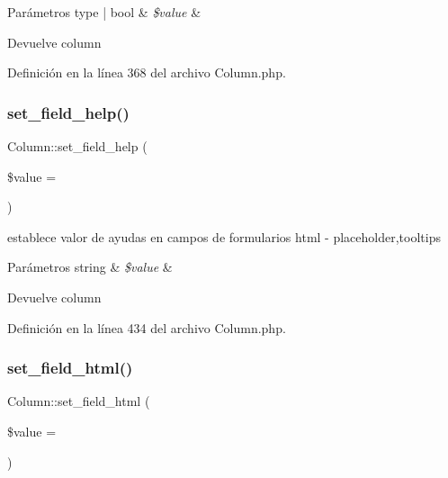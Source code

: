 \begin{DoxyParams}[1]{Parámetros}
type | bool & {\em \$value} & \\
\hline
\end{DoxyParams}
\begin{DoxyReturn}{Devuelve}
column 
\end{DoxyReturn}


Definición en la línea 368 del archivo Column.\+php.

\mbox{\label{class_column_ad21200d7ae8693427a38e51c100badf6}} 
\subsubsection{\texorpdfstring{set\_field\_help()}{set\_field\_help()}}
{\footnotesize\ttfamily Column\+::set\+\_\+field\+\_\+help (\begin{DoxyParamCaption}\item[{}]{\$value = {\ttfamily \textquotesingle{}\textquotesingle{}} }\end{DoxyParamCaption})}

establece valor de ayudas en campos de formularios html -\/ placeholder,tooltips


\begin{DoxyParams}[1]{Parámetros}
string & {\em \$value} & \\
\hline
\end{DoxyParams}
\begin{DoxyReturn}{Devuelve}
column 
\end{DoxyReturn}


Definición en la línea 434 del archivo Column.\+php.

\mbox{\label{class_column_a5437315051a5e96842582d3668554245}} 
\subsubsection{\texorpdfstring{set\_field\_html()}{set\_field\_html()}}
{\footnotesize\ttfamily Column\+::set\+\_\+field\+\_\+html (\begin{DoxyParamCaption}\item[{}]{\$value = {\ttfamily \textquotesingle{}\textquotesingle{}} }\end{DoxyParamCaption})}

